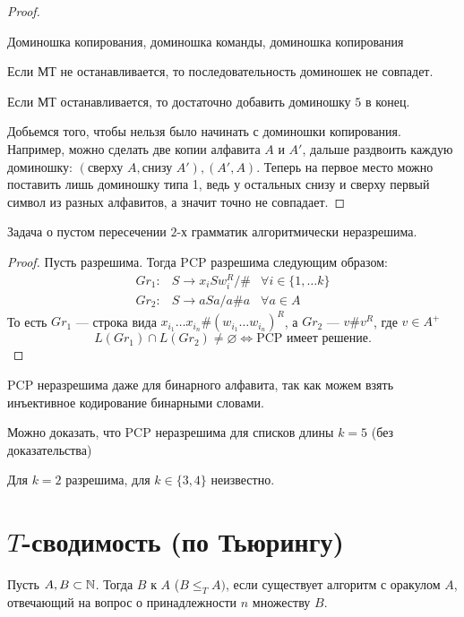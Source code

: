 \begin{proof}
\begin{description}
			Доминошка копирования, доминошка команды, доминошка копирования
	\end{description}
	Если МТ не останавливается, то последовательность доминошек не совпадет.

	Если МТ останавливается, то достаточно добавить доминошку  $ 5$ в конец.

	Добьемся того, чтобы нельзя было начинать с доминошки копирования. 
	Например, можно сделать две копии алфавита $ A$ и $ A'$,
	дальше раздвоить каждую доминошку: $ (\text{сверху }A, \text{снизу }A'), (A', A)$.
	Теперь на первое место можно поставить лишь доминошку типа 1, 
	ведь у остальных снизу и сверху первый символ из разных алфавитов, а значит точно не совпадает.
\end{proof}


\begin{cor}
    Задача о пустом пересечении $ 2$-х грамматик алгоритмически неразрешима.
\end{cor}
\begin{proof}
	Пусть разрешима. Тогда  PCP разрешима следующим образом:
	\[
	\begin{aligned}
		Gr_1 \colon& S \to  x_i S w_i^R / \# & \forall i \in \{1, \ldots k\} \\
		Gr_2 \colon& S \to  a S a / a\#a & \forall a \in A
	\end{aligned}
	\]
	То есть $ Gr_1$ --- строка вида $  x_{i_1} \ldots x_{i_n} \# (w_{i_1}\ldots w_{i_{n}})^{R}$, а  $ Gr_2$ --- $ v\#v ^{R}$, где $ v \in A^{+}$
	\[
		L(Gr_1) \cap L(Gr_2) \ne  \varnothing \Longleftrightarrow \text{PCP имеет решение}
	.\] 
\end{proof}

\begin{note}
    PCP неразрешима даже для бинарного алфавита, так как можем взять инъективное кодирование бинарными словами.
\end{note}
\begin{note}
	Можно доказать, что PCP неразрешима для списков длины $ k = 5$ (без доказательства)
\end{note}
\begin{note}
    Для $k= 2$ разрешима, для $ k \in \{3, 4\}$ неизвестно.
\end{note}

\section{$T$-сводимость (по Тьюрингу)}
\begin{defn} 
	Пусть $ A, B \subset \mathbb{N}$. Тогда $ B$  к $ A$ ($ B \le _{T}  A)$, если существует алгоритм с оракулом $ A$, отвечающий на вопрос о принадлежности  $ n $ множеству $ B$.
\end{defn}


